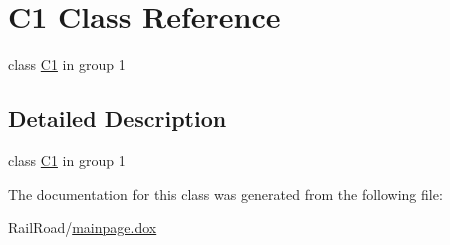 \hypertarget{class_c1}{\section{C1 Class Reference}
\label{class_c1}
}


class \hyperlink{class_c1}{C1} in group 1  




\subsection{Detailed Description}
class \hyperlink{class_c1}{C1} in group 1 

The documentation for this class was generated from the following file\-:\begin{DoxyCompactItemize}
\item 
Rail\-Road/\hyperlink{mainpage_8dox}{mainpage.\-dox}\end{DoxyCompactItemize}
